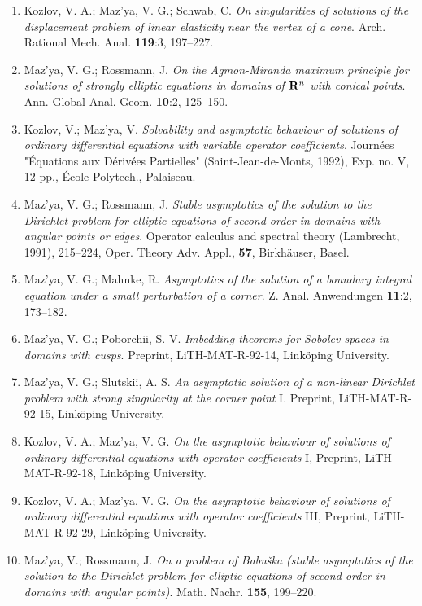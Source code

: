 \documentclass{article}
\begin{document}
\begin{enumerate}
{\bf 1992}
\item Kozlov, V. A.; Maz'ya, V. G.; Schwab, C. {\it On singularities
of
solutions of the displacement problem
of linear elasticity near the vertex of a cone}. Arch. Rational Mech.
Anal.
{\bf 119}:3, 197--227.
\item Maz'ya, V. G.; Rossmann, J. {\it On the Agmon-Miranda maximum
principle for solutions of
strongly elliptic equations in domains of ${\bf R}\sp n$ with conical
points}. Ann. Global Anal. Geom. {\bf 10}:2,
125--150.
\item Kozlov, V.; Maz'ya, V. {\it Solvability and asymptotic behaviour
of
solutions of ordinary differential equations
with variable operator coefficients}. Journ\'ees "\'Equations aux
D\'eriv\'ees Partielles" (Saint-Jean-de-Monts, 1992), Exp. no. V,
12 pp., \'Ecole Polytech., Palaiseau.
\item Maz'ya, V. G.; Rossmann, J. {\it Stable asymptotics of the
solution
to the Dirichlet problem
for elliptic equations of second order in domains with angular points
or
edges}. Operator calculus and spectral theory (Lambrecht,
1991), 215--224, Oper. Theory Adv. Appl., {\bf 57}, Birkh{\"a}user,
Basel.
\item Maz'ya, V. G.; Mahnke, R. {\it Asymptotics of the solution of a
boundary integral equation under a
small perturbation of a corner}. Z. Anal. Anwendungen {\bf 11}:2,
173--182.
\item Maz'ya, V. G.; Poborchii, S. V. {\it Imbedding theorems for
Sobolev
spaces in domains with cusps}. Preprint, LiTH-MAT-R-92-14,
Link\"oping University.
\item Maz'ya, V. G.; Slutskii, A. S. {\it An asymptotic solution of a
non-linear Dirichlet problem with strong singularity at the
corner point} I. Preprint, LiTH-MAT-R-92-15, Link\"oping University.
\item Kozlov, V. A.; Maz'ya, V. G. {\it On the asymptotic behaviour of
solutions of ordinary differential equations with operator
coefficients} I, Preprint, LiTH-MAT-R-92-18, Link\"oping University.
\item Kozlov, V. A.; Maz'ya, V. G. {\it On the asymptotic behaviour of
solutions of ordinary differential equations with operator
coefficients} III, Preprint, LiTH-MAT-R-92-29, Link\"oping University.


\item Maz'ya, V.; Rossmann, J. {\it On a problem of Babu\v ska (stable
asymptotics of the solution
to the Dirichlet problem for elliptic equations of second order in
domains
with angular points)}. Math. Nachr. {\bf 155},
199--220.\hfill\break


\end{enumerate}
\end{document}

